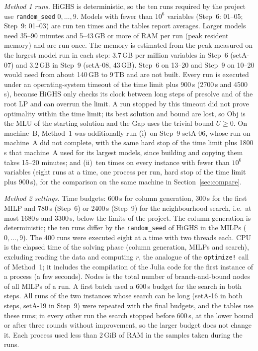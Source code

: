 \documentclass[conference]{IEEEtran}
\begin{document}
\emph{Method 1 runs.} HiGHS is deterministic, so the ten runs required by the project use \texttt{random\_seed} $0,\dots,9$. Models with fewer than $10^6$ variables (Step~6: 01--05; Step~9: 01--03) are run ten times and the tables report averages. Larger models need 35--90 minutes and 5--43\,GB or more of RAM per run (peak resident memory) and are run once. The memory is estimated from the peak measured on the largest model run in each step: 3.7\,GB per million variables in Step~6 (setA-07) and 3.2\,GB in Step~9 (setA-08, 43\,GB). Step~6 on 13--20 and Step~9 on 10--20 would need from about 140\,GB to 9\,TB and are not built. Every run is executed under an operating-system timeout of the time limit plus 900\,s (2700\,s and 4500\,s), because HiGHS only checks its clock between long steps of presolve and of the root LP and can overrun the limit. A run stopped by this timeout did not prove optimality within the time limit; its best solution and bound are lost, so Obj is the MLU of the starting solution and the Gap uses the trivial bound $U\ge0$. On machine~B, Method~1 was additionally run (i)~on Step~9 setA-06, whose run on machine~A did not complete, with the same hard stop of the time limit plus 1800\,s that machine~A used for its largest models, since building and copying them takes 15--20 minutes; and (ii)~ten times on every instance with fewer than $10^6$ variables (eight runs at a time, one process per run, hard stop of the time limit plus 900\,s), for the comparison on the same machine in Section~\ref{sec:compare}.

\emph{Method 2 settings.} Time budgets: 600\,s for column generation, 300\,s for the first MILP and 780\,s (Step~6) or 2400\,s (Step~9) for the neighbourhood search, i.e.\ at most 1680\,s and 3300\,s, below the limits of the project. The column generation is deterministic; the ten runs differ by the \texttt{random\_seed} of HiGHS in the MILPs ($0,\dots,9$). The 400 runs were executed eight at a time with two threads each. CPU is the elapsed time of the solving phase (column generation, MILPs and search), excluding reading the data and computing $r$, the analogue of the \texttt{optimize!} call of Method~1; it includes the compilation of the Julia code for the first instance of a process (a few seconds). Nodes is the total number of branch-and-bound nodes of all MILPs of a run. A first batch used a 600\,s budget for the search in both steps. All runs of the two instances whose search can be long (setA-16 in both steps, setA-19 in Step~9) were repeated with the final budgets, and the tables use these runs; in every other run the search stopped before 600\,s, at the lower bound or after three rounds without improvement, so the larger budget does not change it. Each process used less than 2\,GiB of RAM in the samples taken during the runs.
\end{document}
